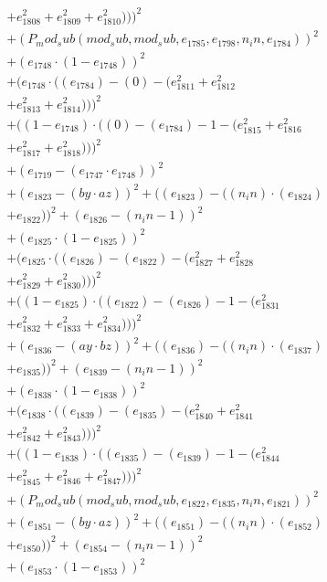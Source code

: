 \documentclass[10pt, a4paper]{article}
\begin{document}
\begin{small}
\begin{align*}
& + e_{1808}^{2} + e_{1809}^{2} + e_{1810}^{2})))^{2} \\
& + (P_mod_sub(mod_sub, mod_sub, e_{1785}, e_{1798}, n_in, e_{1784}))^{2} \\
& + (e_{1748}  \cdot  (1 - e_{1748}))^{2} \\
& + (e_{1748}  \cdot  ((e_{1784}) - (0) - (e_{1811}^{2} + e_{1812}^{2} \\
& + e_{1813}^{2} + e_{1814}^{2})))^{2} \\
& + ((1 - e_{1748})  \cdot  ((0) - (e_{1784}) - 1 - (e_{1815}^{2} + e_{1816}^{2} \\
& + e_{1817}^{2} + e_{1818}^{2})))^{2} \\
& + (e_{1719} - (e_{1747}  \cdot  e_{1748}))^{2} \\
& + (e_{1823} - (by  \cdot  az))^{2} + ((e_{1823}) - ((n_in)  \cdot  (e_{1824}) \\
& + e_{1822}))^{2} + (e_{1826} - (n_in - 1))^{2} \\
& + (e_{1825}  \cdot  (1 - e_{1825}))^{2} \\
& + (e_{1825}  \cdot  ((e_{1826}) - (e_{1822}) - (e_{1827}^{2} + e_{1828}^{2} \\
& + e_{1829}^{2} + e_{1830}^{2})))^{2} \\
& + ((1 - e_{1825})  \cdot  ((e_{1822}) - (e_{1826}) - 1 - (e_{1831}^{2} \\
& + e_{1832}^{2} + e_{1833}^{2} + e_{1834}^{2})))^{2} \\
& + (e_{1836} - (ay  \cdot  bz))^{2} + ((e_{1836}) - ((n_in)  \cdot  (e_{1837}) \\
& + e_{1835}))^{2} + (e_{1839} - (n_in - 1))^{2} \\
& + (e_{1838}  \cdot  (1 - e_{1838}))^{2} \\
& + (e_{1838}  \cdot  ((e_{1839}) - (e_{1835}) - (e_{1840}^{2} + e_{1841}^{2} \\
& + e_{1842}^{2} + e_{1843}^{2})))^{2} \\
& + ((1 - e_{1838})  \cdot  ((e_{1835}) - (e_{1839}) - 1 - (e_{1844}^{2} \\
& + e_{1845}^{2} + e_{1846}^{2} + e_{1847}^{2})))^{2} \\
& + (P_mod_sub(mod_sub, mod_sub, e_{1822}, e_{1835}, n_in, e_{1821}))^{2} \\
& + (e_{1851} - (by  \cdot  az))^{2} + ((e_{1851}) - ((n_in)  \cdot  (e_{1852}) \\
& + e_{1850}))^{2} + (e_{1854} - (n_in - 1))^{2} \\
& + (e_{1853}  \cdot  (1 - e_{1853}))^{2} \\

\end{align*}
\end{small}
\end{document}
